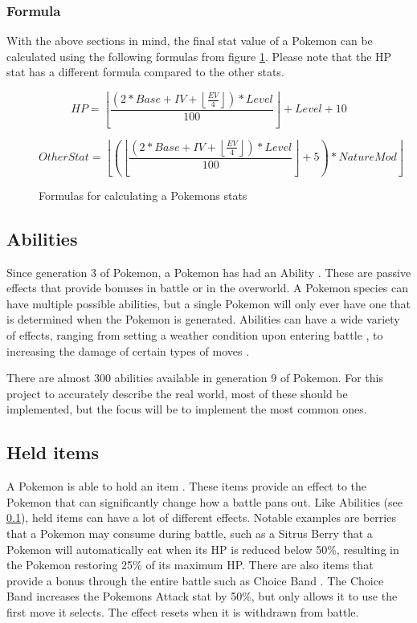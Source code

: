 \subsubsection{Formula}
With the above sections in mind, the final stat value of a Pokemon can be calculated using the following formulas from figure \ref{formula:stat-formula}.
Please note that the HP stat has a different formula compared to the other stats.

\begin{figure}[H]
  $$
    HP = \left\lfloor \frac{(2 * Base + IV + \left\lfloor \frac{EV}{4} \right\rfloor) * Level}{100} \right\rfloor + Level + 10
  $$
  
  $$
    OtherStat = \left\lfloor \left( \left\lfloor \frac{(2 * Base + IV + \left\lfloor \frac{EV}{4} \right\rfloor) * Level}{100} \right\rfloor + 5 \right) * NatureMod \right\rfloor
  $$
  \caption{Formulas for calculating a Pokemons stats \cite{PokemonStats}}
  \label{formula:stat-formula}
\end{figure}

\subsection{Abilities}
\label{subsec:abilities}
Since generation 3 of Pokemon, a Pokemon has had an Ability \cite{Abilities}. These are passive effects that provide bonuses in battle or in the overworld.
A Pokemon species can have multiple possible abilities, but a single Pokemon will only ever have one that is determined when the Pokemon is generated.
Abilities can have a wide variety of effects, ranging from setting a weather condition upon entering battle \cite{DrizzleAbility}, to increasing the damage of certain types of moves \cite{IronFistAbility}.

There are almost 300 abilities available in generation 9 of Pokemon. For this project to accurately describe the real world, most of these should be implemented, but the focus will be to implement the most common ones.

\subsection{Held items}
A Pokemon is able to hold an item \cite{HeldItems}. These items provide an effect to the Pokemon that can significantly change how a battle pans out. Like Abilities (see \ref{subsec:abilities}),
held items can have a lot of different effects. Notable examples are berries that a Pokemon may consume during battle, such as a Sitrus Berry \cite{SitrusBerry} that a Pokemon will automatically eat
when its HP is reduced below 50\%, resulting in the Pokemon restoring 25\% of its maximum HP. There are also items that provide a bonus through the entire battle such as Choice Band \cite{ChoiceBand}.
The Choice Band increases the Pokemons Attack stat by 50\%, but only allows it to use the first move it selects. The effect resets when it is withdrawn from battle.

